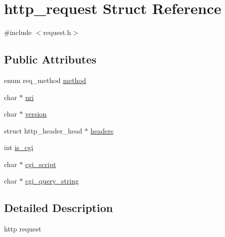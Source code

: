 \hypertarget{structhttp__request}{
\section{http\_\-request Struct Reference}
\label{structhttp__request}
}


{\ttfamily \#include $<$request.h$>$}

\subsection*{Public Attributes}
\begin{DoxyCompactItemize}
\item 
enum req\_\-method \hyperlink{structhttp__request_a9c335e7e58b388eebbc47566bac7ccf8}{method}
\item 
char $\ast$ \hyperlink{structhttp__request_a4e9a04ec2dbeaa73b61021d4ef643e46}{uri}
\item 
char $\ast$ \hyperlink{structhttp__request_afe666e8ccf16d468d71ec116914d6432}{version}
\item 
struct http\_\-header\_\-head $\ast$ \hyperlink{structhttp__request_a93e4704948ed590362fe6c109a548174}{headers}
\item 
int \hyperlink{structhttp__request_a539af9f5712d370caf999c9507cf4302}{is\_\-cgi}
\item 
char $\ast$ \hyperlink{structhttp__request_a1bdae16cb3c4e415fbdc0f1038f0d4ca}{cgi\_\-script}
\item 
char $\ast$ \hyperlink{structhttp__request_a7921955f2c90460106baa8989aba0444}{cgi\_\-query\_\-string}
\end{DoxyCompactItemize}


\subsection{Detailed Description}
http request 

